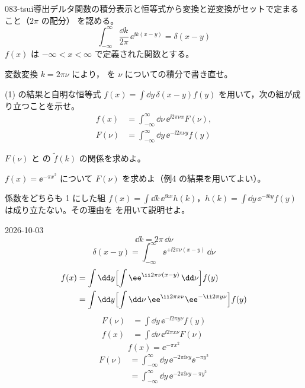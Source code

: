 \documentclass[uplatex,dvipdfmx,a4paper,11pt]{jsarticle}
\begin{document}
\begin{mondai}{083-tsui}{導出}{デルタ関数の積分表示と恒等式から変換と逆変換がセットで定まること（$2\pi$ の配分）}
 を認める。
  \[ \int_{-\infty}^{\infty}\frac{\dd k}{2\pi}\,\ee^{\ii k(x-y)}=\delta(x-y) \]
  $f(x)$ は $-\infty<x<\infty$ で定義された関数とする。
  \begin{shoumon}
    \item 変数変換 $k=2\pi\nu$ により， を $\nu$ についての積分で書き直せ。
    \item (1) の結果と自明な恒等式 $f(x)=\int\dd y\,\delta(x-y)f(y)$ を用いて，次の組が成り立つことを示せ。
      \begin{align*}
        f(x)&=\int_{-\infty}^{\infty}\dd\nu\,\ee^{\ii2\pi\nu x}F(\nu),\\
        F(\nu)&=\int_{-\infty}^{\infty}\dd y\,\ee^{-\ii2\pi\nu y}f(y)
      \end{align*}
    \item $F(\nu)$ と  の $\tilde f(k)$ の関係を求めよ。
    \item $f(x)=\ee^{-\pi x^{2}}$ について $F(\nu)$ を求めよ（例4 の結果を用いてよい）。 %
    \item 係数をどちらも 1 にした組 $f(x)=\int\dd k\,\ee^{\ii kx}h(k)$，$h(k)=\int\dd y\,\ee^{-\ii ky}f(y)$ は成り立たない。その理由を  を用いて説明せよ。
  \end{shoumon}
\begin{kotaeutsushi}{2026-10-03}
\[ \dd k=2\pi\,\dd\nu \]
\[ \delta(x-y)=\int_{-\infty}^{\infty}\ee^{+\ii2\pi\nu(x-y)}\,\dd\nu \]
\begin{align*}
  f(x)&=\int\dd y\Bigl[\int\ee^{\ii2\pi\nu(x-y)}\,\dd\nu\Bigr]f(y)\\
  &=\int\dd y\Bigl[\int\dd\nu\,\ee^{\ii2\pi x\nu}\ee^{-\ii2\pi y\nu}\Bigr]f(y)
\end{align*}
\begin{align*}
  F(\nu)&=\int\dd y\,\ee^{-\ii2\pi y\nu}f(y)\\
  f(x)&=\int\dd\nu\,\ee^{\ii2\pi x\nu}F(\nu)
\end{align*}
\mikai
{}
\[ f(x)=\ee^{-\pi x^{2}} \]
\begin{align*}
  F(\nu)&=\int_{-\infty}^{\infty}\dd y\,\ee^{-2\pi\ii\nu y}\ee^{-\pi y^{2}}\\
  &=\int_{-\infty}^{\infty}\dd y\,\ee^{-2\pi\ii\nu y-\pi y^{2}}

\end{align*}
\end{kotaeutsushi}
\end{mondai}
\end{document}
